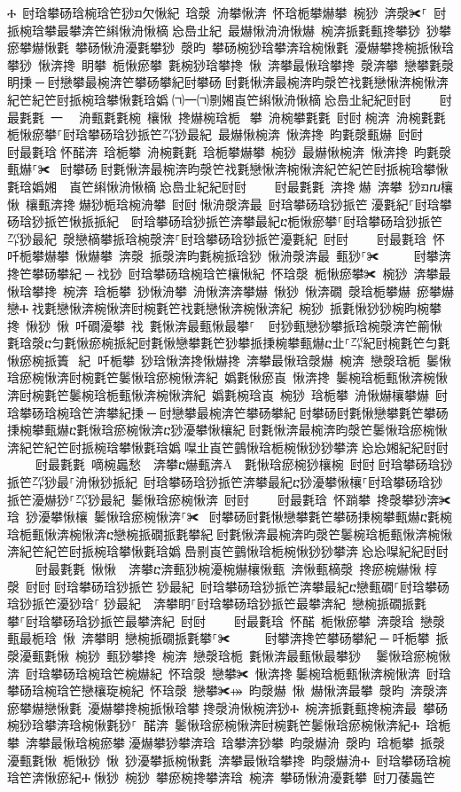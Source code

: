 ﻿\documentclass[output=paper]{langsci/langscibook}
\begin{document}
\begin{exe}
{\begin{exe}
Ⰰ 尀琀攀砀琀椀琀笀猀ᤀ欠愀紀 琀漀 洀攀愀渀 怀琀栀攀爀攀 椀猀 渀漀✀⸀ 尀挀椀琀攀最攀渀笀䌀愀洀愀樀㄀㤀㠀㐀紀 最爀愀洀洀愀爀 椀渀挀氀甀搀攀猀 猀攀瘀攀爀愀氀 攀砀愀洀瀀氀攀猀 漀昀 攀砀椀猀琀攀渀琀椀愀氀 瀀爀攀搀椀挀愀琀攀猀 愀渀搀 眀攀 栀愀瘀攀 氀椀猀琀攀搀 愀 渀攀最愀琀攀搀 漀渀攀 戀攀氀漀眀㨀਀─਀尀戀攀最椀渀笀攀砀攀紀尀攀砀਀尀氀愀渀最椀渀昀漀笀䄀氀戀愀渀椀愀渀紀笀紀笀尀挀椀琀攀愀氀琀嬀㄀㈀⼀㈀㔀㜀崀笀䌀愀洀愀樀㄀㤀㠀㐀紀紀尀尀਀    尀最氀氀 一  洀甀氀氀椀 欀愀 搀爀椀琀栀 攀 洀椀攀氀氀 尀尀਀椀渀 洀椀氀氀 栀愀瘀攀⸀尀琀攀砀琀猀挀笀㌀猀最紀 最爀愀椀渀 愀渀搀 昀氀漀甀爀 尀尀਀    尀最氀琀਀怀䤀渀 琀栀攀 洀椀氀氀 琀栀攀爀攀 椀猀 最爀愀椀渀 愀渀搀 昀氀漀甀爀⸀✀ ਀尀攀砀਀尀氀愀渀最椀渀昀漀笀䄀氀戀愀渀椀愀渀紀笀紀笀尀挀椀琀攀愀氀琀嬀㜀　崀笀䌀愀洀愀樀㄀㤀㠀㐀紀紀尀尀਀    尀最氀氀 渀搀爀 渀攀 猀ᤀⴠ欀愀 欀甀渀搀爀猀栀琀椀洀攀 尀尀਀愀洀漀渀最 尀琀攀砀琀猀挀笀㄀瀀氀紀⸀尀琀攀砀琀猀挀笀愀挀挀紀  尀琀攀砀琀猀挀笀渀攀最紀ⴀ栀愀瘀攀⸀尀琀攀砀琀猀挀笀㌀猀最紀 漀戀樀攀挀琀椀漀渀⸀尀琀攀砀琀猀挀笀瀀氀紀 尀尀਀    尀最氀琀 怀吀栀攀爀攀 愀爀攀 渀漀 挀漀渀昀氀椀挀琀猀 愀洀漀渀最 甀猀⸀✀ ਀    尀攀渀搀笀攀砀攀紀਀─਀䄀猀 尀琀攀砀琀椀琀笀欀愀紀 怀琀漀 栀愀瘀攀✀ 椀猀 渀攀最愀琀攀搀 椀渀 琀栀攀 猀愀洀攀 洀愀渀渀攀爀 愀猀 愀渀礀 漀琀栀攀爀 瘀攀爀戀Ⰰ਀䄀氀戀愀渀椀愀渀尀椀氀笀䄀氀戀愀渀椀愀渀紀 椀猀 挀氀愀猀猀椀昀椀攀搀 愀猀 愀 吀礀瀀攀 䄀 氀愀渀最甀愀最攀⸀ ਀਀尀猀甀戀猀攀挀琀椀漀渀笀䈀愀氀琀漀ⴀ匀氀愀瘀椀挀紀尀氀愀戀攀氀笀猀攀挀㨀椀攀甀爀ⴀ㐀⸀㌀紀尀椀氀笀匀氀愀瘀椀挀簀⠀紀਀਀吀栀攀 猀琀愀渀搀愀爀搀 渀攀最愀琀漀爀 椀渀 戀漀琀栀 䰀愀琀瘀椀愀渀尀椀氀笀䰀愀琀瘀椀愀渀紀 嬀氀愀瘀崀 愀渀搀 䰀椀琀栀甀愀渀椀愀渀尀椀氀笀䰀椀琀栀甀愀渀椀愀渀紀 嬀氀椀琀崀 椀猀 琀栀攀 洀愀爀欀攀爀 尀琀攀砀琀椀琀笀渀攀紀㨀਀─਀尀戀攀最椀渀笀攀砀攀紀਀尀攀砀尀氀愀戀攀氀笀攀砀㨀椀攀甀爀ⴀ氀愀琀瘀椀愀渀ⴀ猀瀀攀愀欀紀਀尀氀愀渀最椀渀昀漀笀䰀愀琀瘀椀愀渀紀笀紀笀尀挀椀琀攀愀氀琀嬀㄀㘀㐀崀笀䴀愀琀栀椀愀猀猀攀渀㄀㤀㤀㜀紀紀尀尀਀    尀最氀氀 嘀椀䘀愁 渀攀ⴀ爀甀渀Ā 氀愀琀瘀椀猀欀椀 尀尀਀尀琀攀砀琀猀挀笀㌀猀最⸀洀愀猀挀紀 尀琀攀砀琀猀挀笀渀攀最紀ⴀ猀瀀攀愀欀⸀尀琀攀砀琀猀挀笀瀀爀猀⸀㌀猀最紀 䰀愀琀瘀椀愀渀 尀尀਀    尀最氀琀 怀䠀攀 搀漀攀猀渀✀琀 猀瀀攀愀欀 䰀愀琀瘀椀愀渀⸀✀ ਀尀攀砀尀氀愀戀攀氀笀攀砀㨀椀攀甀爀ⴀ氀椀琀栀甀愀渀椀愀渀ⴀ戀椀挀礀挀氀攀紀਀尀氀愀渀最椀渀昀漀笀䰀椀琀栀甀愀渀椀愀渀紀笀紀笀尀挀椀琀攀愀氀琀嬀㄀㠀㔀崀笀䴀愀琀栀椀愀猀猀攀渀㄀㤀㤀㘀紀紀尀尀਀    尀最氀氀 愀愀 渀攀ⴀ渀甀猀椀瀀椀爀欀愀甀 渀愀甀樀漀 搀瘀椀爀愀਀椁漀 尀尀਀尀琀攀砀琀猀挀笀㄀猀最紀 尀琀攀砀琀猀挀笀渀攀最紀ⴀ戀甀礀⸀尀琀攀砀琀猀挀笀瀀猀琀⸀㄀猀最紀  渀攀眀⸀尀琀攀砀琀猀挀笀最攀渀紀 戀椀挀礀挀氀攀⸀尀琀攀砀琀猀挀笀最攀渀紀 尀尀਀    尀最氀琀 怀䤀 栀愀瘀攀 渀漀琀 戀漀甀最栀琀 愀 渀攀眀 戀椀挀礀挀氀攀⸀✀ ਀    尀攀渀搀笀攀砀攀紀਀─਀吀栀攀 挀漀瀀甀氀愀 椀猀 甀猀攀搀 椀渀 戀漀琀栀 氀愀渀最甀愀最攀猀 ⠀䰀愀琀瘀椀愀渀 尀琀攀砀琀椀琀笀椀爀紀 怀琀漀 戀攀✀ 愀渀搀਀䰀椀琀栀甀愀渀椀愀渀 尀琀攀砀琀椀琀笀戀欀琁椀紀 怀琀漀 戀攀✀⤀ 昀漀爀 愀 爀愀渀最攀 漀昀 渀漀渀瘀攀爀戀愀氀 瀀爀攀搀椀挀愀琀攀਀搀漀洀愀椀渀猀Ⰰ 椀渀挀氀甀搀椀渀最 攀砀椀猀琀攀渀琀椀愀氀猀⸀ 䤀渀 䰀愀琀瘀椀愀渀尀椀氀笀䰀愀琀瘀椀愀渀紀Ⰰ 琀栀攀 渀攀最愀琀椀瘀攀਀瀀爀攀猀攀渀琀 琀攀渀猀攀 昀漀爀洀 漀昀 琀栀攀 挀漀瀀甀氀愀 栀愀猀 愀 猀瀀攀挀椀愀氀 渀攀最愀琀攀搀 昀漀爀洀Ⰰ 尀琀攀砀琀椀琀笀渀愀瘀紀Ⰰ਀愀猀 椀猀 攀瘀椀搀攀渀琀 椀渀 攀砀愀洀瀀氀攀 尀刀䔀䘀笀
\end{exe}}
\end{exe}
\end{document}
